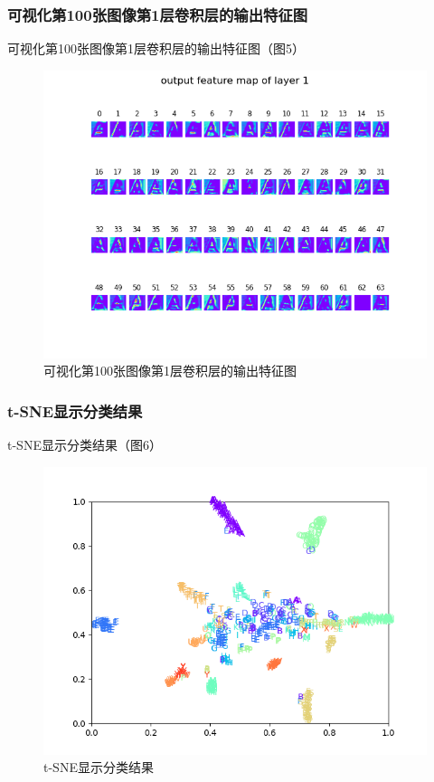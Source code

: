 \documentclass[a4paper]{article}
\begin{document}
\subsubsection{可视化第100张图像第1层卷积层的输出特征图}
可视化第100张图像第1层卷积层的输出特征图（图5）\\
\begin{figure}
    \centering
    \includegraphics[width=12cm]{Fig5.png}
    \caption{可视化第100张图像第1层卷积层的输出特征图}
\end{figure}

\subsubsection{t-SNE显示分类结果}
t-SNE显示分类结果（图6）\\
\begin{figure}
    \centering
    \includegraphics[width=12cm]{Fig6.png}
    \caption{t-SNE显示分类结果}
\end{figure}
\end{document}
